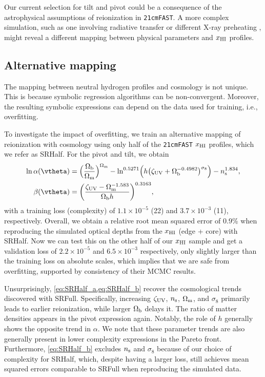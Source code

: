 Our current selection for tilt and pivot could be a consequence of the
astrophysical assumptions of reionization in \texttt{21cmFAST}.
A more complex simulation, such as one involving radiative transfer or
different X-ray preheating \cite{Montero2024}, might reveal a different
mapping between physical parameters and $x_{\mathrm{HI}}$ profiles.


\subsection*{Alternative mapping}
\label{ssec:SRHalf}

The mapping between neutral hydrogen profiles and cosmology is not
unique.
This is because symbolic regression algorithms can be non-convergent.
Moreover, the resulting symbolic expressions can depend on the data used
for training, i.e., overfitting.

To investigate the impact of overfitting, we train an alternative
mapping of reionization with cosmology using only half of the
\texttt{21cmFAST} $x_{\mathrm{HI}}$ profiles, which we refer as SRHalf.
For the pivot and tilt, we obtain
%
\begin{align}
\label{eq:SRHalf_a}
\ln\ap(\vtheta) &= \Bigl(\frac{\Omegab}{\Omegam}\Bigr)^{\Omegam}
  - \ln^{0.5271} \Bigl(h \bigl(\zetaUV
    + \Omegab^{-0.4982}\bigr)^{\sigma_8}\Bigr)
  - \ns^{1.834}, \\
%
\label{eq:SRHalf_b}
\beta(\vtheta) &= \biggl(\frac{\zetaUV - \Omegam^{-1.583}}{\Omegab h}
  \biggr)^{0.3163},
\end{align}
%
with a training loss (complexity) of $1.1 \times 10^{-5}$ (22) and $3.7
\times 10^{-3}$ (11), respectively.
Overall, we obtain a relative root mean squared error of 0.9\% when
reproducing the simulated optical depths from the $x_{\mathrm{HI}}$ (edge + core)
with SRHalf.
Now we can test this on the other half of our $x_{\mathrm{HI}}$ sample and get a
validation loss of $2.2 \times 10^{-5}$ and $6.5 \times 10^{-3}$
respectively, only slightly larger than the training loss on absolute
scales, which implies that we are safe from overfitting, supported by
consistency of their MCMC results.

Unsurprisingly, \cref{eq:SRHalf_a,eq:SRHalf_b} recover the cosmological
trends discovered with SRFull.
Specifically, increasing $\zeta_\mathrm{UV}$, $n_\mathrm{s}$, $\Omega_\mathrm{m}$, and $\sigma_8$
primarily leads to earlier reionization, while larger $\Omega_\mathrm{b}$ delays
it.
The ratio of matter densities appears in the pivot expression again.
Notably, the role of $h$ generally shows the opposite trend in $\alpha$.
We note that these parameter trends are also generally present in lower
complexity expressions in the Pareto front.
Furthermore, \cref{eq:SRHalf_b} excludes $n_\mathrm{s}$ and $\sigma_8$ because of
our choice of complexity for SRHalf, which, despite having a larger
loss, still achieves mean squared errors comparable to SRFull when
reproducing the simulated data.

